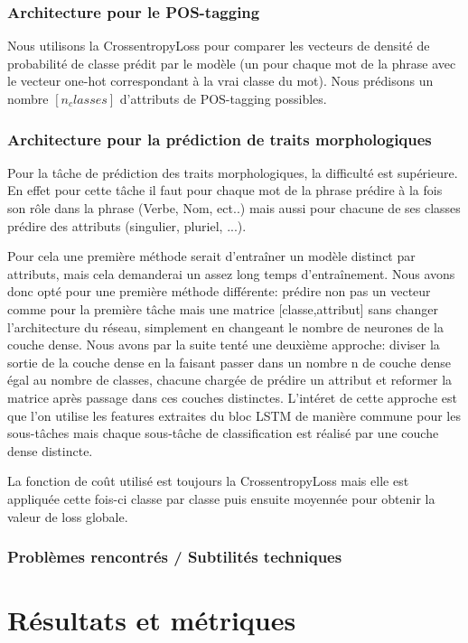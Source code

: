 \documentclass[a4paper]{article}
\begin{document}
\subsubsection{Architecture pour le POS-tagging}
Nous utilisons la CrossentropyLoss pour comparer les vecteurs de densité de probabilité de classe prédit par le modèle (un pour chaque mot de la phrase avec le vecteur one-hot correspondant à la vrai classe du mot). Nous prédisons un nombre $[n_classes]$ d'attributs de POS-tagging possibles. 

\subsubsection{Architecture pour la prédiction de traits morphologiques}
Pour la tâche de prédiction des traits morphologiques, la difficulté est supérieure. En effet pour cette tâche il faut pour chaque mot de la phrase prédire à la fois son rôle dans la phrase (Verbe, Nom, ect..) mais aussi pour chacune de ses classes prédire des attributs (singulier, pluriel, ...).

Pour cela une première méthode serait d'entraîner un modèle distinct par attributs, mais cela demanderai un assez long temps d'entraînement. Nous avons donc opté pour une première méthode différente: prédire non pas un vecteur comme pour la première tâche mais une matrice [classe,attribut] sans changer l'architecture du réseau, simplement en changeant le nombre de neurones de la couche dense. Nous avons par la suite tenté une deuxième approche: diviser la sortie de la couche dense en la faisant passer dans un nombre n de couche dense égal au nombre de classes, chacune chargée de prédire un attribut et reformer la matrice après passage dans ces couches distinctes. L'intéret de cette approche est que l'on utilise les features extraites du bloc LSTM de manière commune pour les sous-tâches mais chaque sous-tâche de classification est réalisé par une couche dense distincte.

La fonction de coût utilisé est toujours la CrossentropyLoss mais elle est appliquée cette fois-ci classe par classe puis ensuite moyennée pour obtenir la valeur de loss globale.

\subsubsection{Problèmes rencontrés / Subtilités techniques}



\section{Résultats et métriques}
\end{document}
